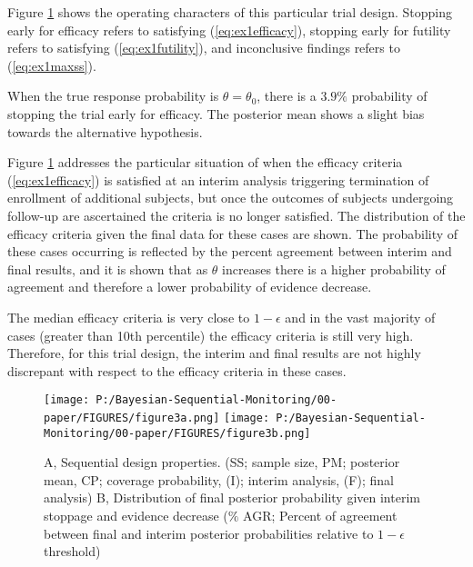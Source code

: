 \documentclass[12pt]{article}
\begin{document}
Figure \ref{fig:ex1.1} shows the operating characters of this particular trial design. Stopping early for efficacy refers to satisfying (\ref{eq:ex1efficacy}), stopping early for futility refers to satisfying (\ref{eq:ex1futility}), and inconclusive findings refers to (\ref{eq:ex1maxss}). 

When the true response probability is $\theta=\theta_0$, there is a $3.9\%$ probability of stopping the trial early for efficacy. The posterior mean shows a slight bias towards the alternative hypothesis.

Figure \ref{fig:ex1.1} addresses the particular situation of when the efficacy criteria (\ref{eq:ex1efficacy}) is satisfied at an interim analysis triggering termination of enrollment of additional subjects, but once the outcomes of subjects undergoing follow-up are ascertained the criteria is no longer satisfied. The distribution of the efficacy criteria given the final data for these cases are shown. The probability of these cases occurring is reflected by the percent agreement between interim and final results, and it is shown that as $\theta$ increases there is a higher probability of agreement and therefore a lower probability of evidence decrease.

The median efficacy criteria is very close to $1-\epsilon$ and in the vast majority of cases (greater than 10th percentile) the efficacy criteria is still very high. Therefore, for this trial design, the interim and final results are not highly discrepant with respect to the efficacy criteria in these cases.
\begin{figure}\begin{center}

    \texttt{[image: P:/Bayesian-Sequential-Monitoring/00-paper/FIGURES/figure3a.png]}
    \texttt{[image: P:/Bayesian-Sequential-Monitoring/00-paper/FIGURES/figure3b.png]}
    \caption{A, Sequential design properties. (SS; sample size, PM; posterior mean, CP; coverage probability, (I); interim analysis, (F); final analysis) B, Distribution of final posterior probability given interim stoppage and evidence decrease ($\%$ AGR; Percent of agreement between final and interim posterior probabilities relative to $1-\epsilon$ threshold)}
	\label{fig:ex1.1}

\end{center}\end{figure}

\end{document}
